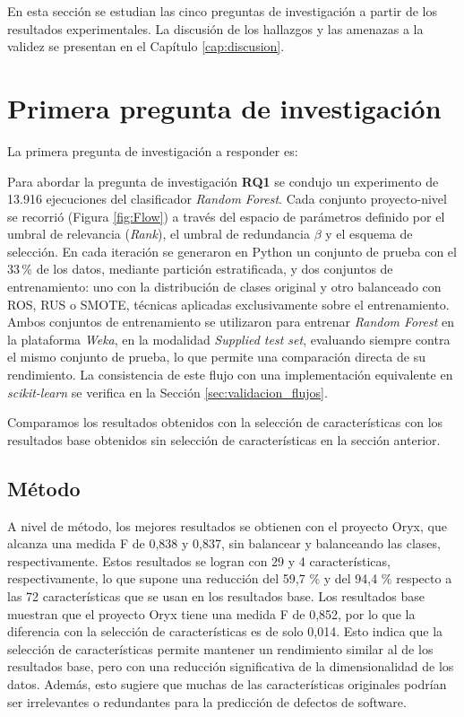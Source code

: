 En esta sección se estudian las cinco preguntas de investigación a partir de los resultados experimentales. La discusión de los hallazgos y las amenazas a la validez se presentan en el Capítulo \ref{cap:discusion}.

\section{Primera pregunta de investigación}
La primera pregunta de investigación a responder es:
\label{sec:RQ1}

\noindent{}
\vspace{12pt}

Para abordar la pregunta de investigación \textbf{RQ1} se condujo un experimento de 13.916 ejecuciones del clasificador \textit{Random Forest}. Cada conjunto proyecto-nivel se recorrió (Figura \ref{fig:Flow}) a través del espacio de parámetros definido por el umbral de relevancia (\textit{Rank}), el umbral de redundancia $\beta$ y el esquema de selección. En cada iteración se generaron en Python un conjunto de prueba con el 33\,\% de los datos, mediante partición estratificada, y dos conjuntos de entrenamiento: uno con la distribución de clases original y otro balanceado con ROS, RUS o SMOTE, técnicas aplicadas exclusivamente sobre el entrenamiento. Ambos conjuntos de entrenamiento se utilizaron para entrenar \textit{Random Forest} en la plataforma \textit{Weka}, en la modalidad \textit{Supplied test set}, evaluando siempre contra el mismo conjunto de prueba, lo que permite una comparación directa de su rendimiento. La consistencia de este flujo con una implementación equivalente en \textit{scikit-learn} se verifica en la Sección \ref{sec:validacion_flujos}.

Comparamos los resultados obtenidos con la selección de características con los resultados base obtenidos sin selección de características en la sección anterior. 

\subsection{Método}
 A nivel de método, los mejores resultados se obtienen con el proyecto Oryx, que alcanza una medida F de 0,838 y 0,837, sin balancear y balanceando las clases, respectivamente. Estos resultados se logran con 29 y 4 características, respectivamente, lo que supone una reducción del 59,7 \% y del 94,4 \% respecto a las 72 características que se usan en los resultados base. Los resultados base muestran que el proyecto Oryx tiene una medida F de 0,852, por lo que la diferencia con la selección de características es de solo 0,014. Esto indica que la selección de características permite mantener un rendimiento similar al de los resultados base, pero con una reducción significativa de la dimensionalidad de los datos. Además, esto sugiere que muchas de las características originales podrían ser irrelevantes o redundantes para la predicción de defectos de software. 

